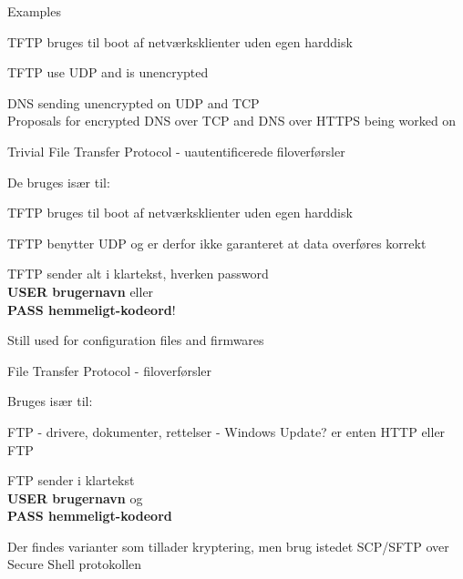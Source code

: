 \documentclass[Screen16to9,17pt]{foils}
\begin{document}

Examples
\begin{list2}
\item TFTP bruges til boot af netværksklienter uden egen harddisk
\item TFTP use UDP and is unencrypted
\item DNS sending unencrypted on UDP and TCP\\
Proposals for encrypted DNS over TCP and DNS over HTTPS being worked on
\end{list2}



\begin{list1}
\item Trivial File Transfer Protocol - uautentificerede filoverførsler
\item De bruges især til:
  \begin{list2}
\item TFTP bruges til boot af netværksklienter uden egen harddisk
\item TFTP benytter UDP og er derfor ikke garanteret at data overføres korrekt
  \end{list2}
\item TFTP sender alt i klartekst, hverken password \\
{\bfseries USER brugernavn} eller \\
{\bfseries PASS hemmeligt-kodeord}!
\end{list1}
Still used for configuration files and firmwares


\begin{list1}
\item File Transfer Protocol - filoverførsler
\item Bruges især til:
  \begin{list2}
    \item FTP - drivere, dokumenter, rettelser - Windows Update? er
    enten HTTP eller FTP
  \end{list2}
\item FTP sender i klartekst\\
{\bfseries USER brugernavn} og \\
{\bfseries PASS hemmeligt-kodeord}
\item Der findes varianter som tillader kryptering, men brug istedet SCP/SFTP over Secure Shell protokollen
\end{list1}
\end{document}
